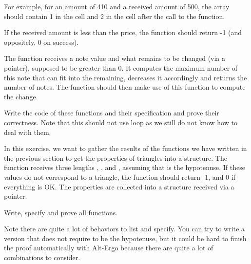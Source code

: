 For example, for an amount of 410 and a received amount of 500, the array
should contain 1 in the cell  and 2 in the cell
 after the call to the function.


If the received amount is less than the price, the function should
return -1 (and oppositely, 0 on success).




The function  receives a note value and
what remains to be changed (via a pointer), supposed to be greater than
0. It computes the maximum number of this note that can fit into the
remaining, decreases it accordingly and returns the number of notes.
The function  should then make use of this function
to compute the change.


Write the code of these functions and their specification and prove their
correctness. Note that this should not use loop as we still do not know
how to deal with them.






In this exercise, we want to gather the results of the functions we have
written in the previous section to get the properties of triangles into
a structure. The function  receives three lengths
, , and , assuming that
 is the hypotenuse. If these values do not correspond to a
triangle, the function should return -1, and 0 if everything is OK. The
properties are collected into a structure  received via
a pointer.




Write, specify and prove all functions.


Note there are quite a lot of behaviors to list and specify. You can try
to write a version that does not require  to be the hypotenuse,
but it could be hard to finish the proof automatically with
Alt-Ergo because there are quite a lot of combinations to consider.


